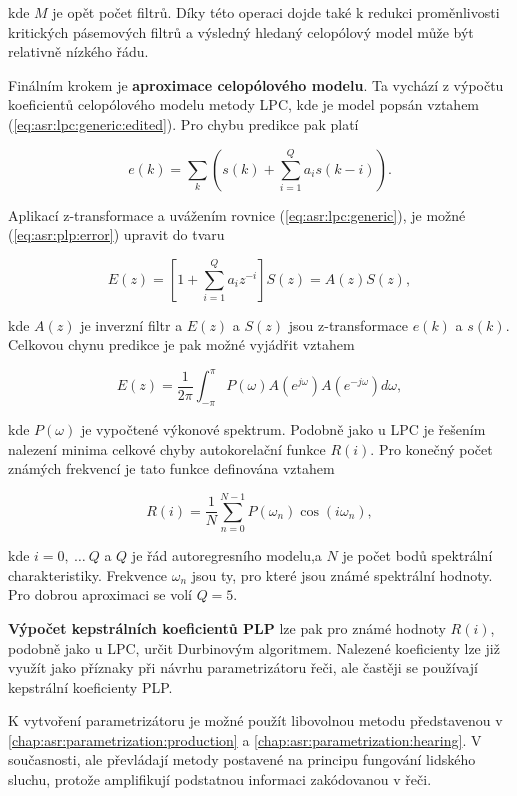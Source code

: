 \noindent kde $M$ je opět počet filtrů. Díky této operaci dojde také k redukci proměnlivosti  kritických pásemových filtrů a výsledný hledaný celopólový model může být relativně nízkého řádu.

Finálním krokem je \textbf{aproximace celopólového modelu}. Ta vychází z výpočtu koeficientů celopólového modelu metody LPC, kde je model popsán vztahem (\ref{eq:asr:lpc:generic:edited}). Pro chybu predikce pak platí

\begin{equation}
  e\left(k\right) = \sum_{k} \left(s\left(k\right) + \sum_{i=1}^{Q} a_i s\left(k - i\right)\right).
  \label{eq:asr:plp:error}
\end{equation}

\noindent Aplikací z-transformace a uvážením rovnice (\ref{eq:asr:lpc:generic}), je možné (\ref{eq:asr:plp:error}) upravit do tvaru

\begin{equation}
  E\left(z\right) = \left[1 + \sum_{i=1}^{Q} a_i z^{-i}\right] S\left(z\right) = A\left(z\right)S\left(z\right),
  \label{eq:asr:plp:error:transform}
\end{equation}

\noindent kde $A\left(z\right)$ je inverzní filtr a $E\left(z\right)$ a $S\left(z\right)$ jsou z-transformace $e\left(k\right)$ a $s\left(k\right)$. Celkovou chynu predikce je pak možné vyjádřit vztahem

\begin{equation}
  E\left(z\right) = \frac{1}{2\pi} \int_{-\pi}^{\pi} P\left(\omega\right) A\left(e^{j\omega}\right) A\left(e^{-j\omega}\right)d\omega,
  \label{eq:asr:plp:error:final}
\end{equation}

\noindent kde $P\left(\omega\right)$ je vypočtené výkonové spektrum. Podobně jako u LPC je řešením nalezení minima celkové chyby autokorelační funkce $R\left(i\right)$. Pro konečný počet známých frekvencí je tato funkce definována vztahem

\begin{equation}
  R\left(i\right) = \frac{1}{N} \sum_{n=0}^{N-1} P\left(\omega_n\right) \cos\left(i\omega_n\right),
  \label{eq:asr:plp:error:solution}
\end{equation}

\noindent kde $i = 0,\ \dots\ Q$ a $Q$ je řád autoregresního modelu,a $N$ je počet bodů spektrální charakteristiky. Frekvence $\omega_n$ jsou ty, pro které jsou známé spektrální hodnoty. Pro dobrou aproximaci se volí $Q = 5$.

\textbf{Výpočet kepstrálních koeficientů PLP} lze pak pro známé hodnoty $R\left(i\right)$, podobně jako u LPC, určit  Durbinovým algoritmem. Nalezené koeficienty lze již využít jako příznaky při návrhu parametrizátoru řeči, ale častěji se používají kepstrální koeficienty PLP. \cite{Holmes2001}

K vytvoření parametrizátoru je možné použít libovolnou metodu představenou v \ref{chap:asr:parametrization:production} a \ref{chap:asr:parametrization:hearing}. V současnosti, ale převládají metody postavené na principu fungování lidského sluchu, protože amplifikují podstatnou informaci zakódovanou v řeči.
